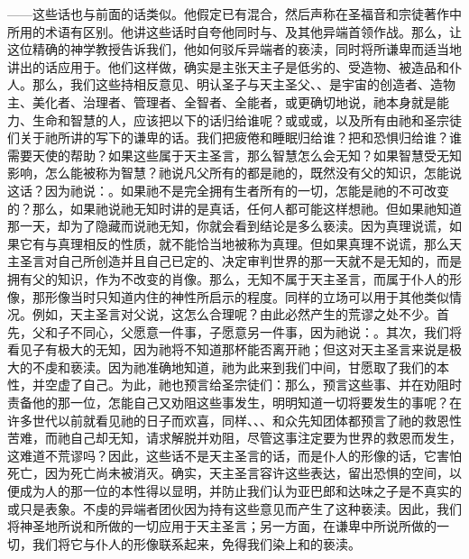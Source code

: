 ——这些话也与前面的话类似。他假定已有混合，然后声称在圣福音和宗徒著作中所用的术语有区别。他讲这些话时自夸他同时与、及其他异端首领作战。那么，让这位精确的神学教授告诉我们，他如何驳斥异端者的亵渎，同时将所谦卑而适当地讲出的话应用于。他们这样做，确实是主张天主子是低劣的、受造物、被造品和仆人。那么，我们这些持相反意见、明认圣子与天主圣父、、是宇宙的创造者、造物主、美化者、治理者、管理者、全智者、全能者，或更确切地说，祂本身就是能力、生命和智慧的人，应该把以下的话归给谁呢？或或或，以及所有由祂和圣宗徒们关于祂所讲的写下的谦卑的话。我们把疲倦和睡眠归给谁？把和恐惧归给谁？谁需要天使的帮助？如果这些属于天主圣言，那么智慧怎么会无知？如果智慧受无知影响，怎么能被称为智慧？祂说凡父所有的都是祂的，既然没有父的知识，怎能说这话？因为祂说：。如果祂不是完全拥有生者所有的一切，怎能是祂的不可改变的？那么，如果祂说祂无知时讲的是真话，任何人都可能这样想祂。但如果祂知道那一天，却为了隐藏而说祂无知，你就会看到结论是多么亵渎。因为真理说谎，如果它有与真理相反的性质，就不能恰当地被称为真理。但如果真理不说谎，那么天主圣言对自己所创造并且自己已定的、决定审判世界的那一天就不是无知的，而是拥有父的知识，作为不改变的肖像。那么，无知不属于天主圣言，而属于仆人的形像，那形像当时只知道内住的神性所启示的程度。同样的立场可以用于其他类似情况。例如，天主圣言对父说，这怎么合理呢？由此必然产生的荒谬之处不少。首先，父和子不同心，父愿意一件事，子愿意另一件事，因为祂说：。其次，我们将看见子有极大的无知，因为祂将不知道那杯能否离开祂；但这对天主圣言来说是极大的不虔和亵渎。因为祂准确地知道，祂为此来到我们中间，甘愿取了我们的本性，并空虚了自己。为此，祂也预言给圣宗徒们：那么，预言这些事、并在劝阻时责备他的那一位，怎能自己又劝阻这些事发生，明明知道一切将要发生的事呢？在许多世代以前就看见祂的日子而欢喜，同样、、、和众先知团体都预言了祂的救恩性苦难，而祂自己却无知，请求解脱并劝阻，尽管这事注定要为世界的救恩而发生，这难道不荒谬吗？因此，这些话不是天主圣言的话，而是仆人的形像的话，它害怕死亡，因为死亡尚未被消灭。确实，天主圣言容许这些表达，留出恐惧的空间，以便成为人的那一位的本性得以显明，并防止我们认为亚巴郎和达味之子是不真实的或只是表象。不虔的异端者团伙因为持有这些意见而产生了这种亵渎。因此，我们将神圣地所说和所做的一切应用于天主圣言；另一方面，在谦卑中所说所做的一切，我们将它与仆人的形像联系起来，免得我们染上和的亵渎。\par

